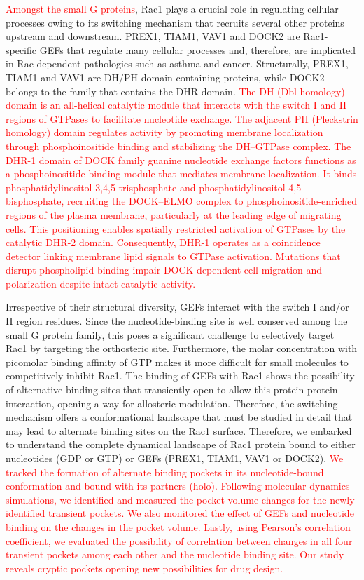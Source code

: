\documentclass[12pt,a4paper]{achemso}
\begin{document}
\textcolor{red}{Amongst the small G proteins}, Rac1 plays a crucial role in regulating cellular processes owing to its switching mechanism that recruits several other proteins upstream and downstream. PREX1, TIAM1, VAV1 and DOCK2 are Rac1-specific GEFs that regulate many cellular processes and, therefore, are implicated in Rac-dependent pathologies such as asthma and cancer.  Structurally, PREX1, TIAM1 and VAV1 are DH/PH domain-containing proteins, while DOCK2 belongs to the family that contains the DHR domain. \textcolor{red}{The DH (Dbl homology) domain is an all-helical catalytic module that interacts with the switch I and II regions of GTPases to facilitate nucleotide exchange. The adjacent PH (Pleckstrin homology) domain regulates activity by promoting membrane localization through phosphoinositide binding and stabilizing the DH–GTPase complex\cite{prex1pdb,tiam1pdb,vav1pdb}.  The DHR-1 domain of DOCK family guanine nucleotide exchange factors\cite{dock2pdb} functions as a phosphoinositide-binding module that mediates membrane localization. It binds phosphatidylinositol-3,4,5-trisphosphate and phosphatidylinositol-4,5-bisphosphate, recruiting the DOCK–ELMO complex to phosphoinositide-enriched regions of the plasma membrane, particularly at the leading edge of migrating cells. This positioning enables spatially restricted activation of GTPases by the catalytic DHR-2 domain. Consequently, DHR-1 operates as a coincidence detector linking membrane lipid signals to GTPase activation. Mutations that disrupt phospholipid binding impair DOCK-dependent cell migration and polarization despite intact catalytic activity.}

Irrespective of their structural diversity, GEFs interact with the switch I and/or II region residues.  Since the nucleotide-binding site is well conserved among the small G protein family, this poses a significant challenge to selectively target Rac1 by targeting the orthosteric site. Furthermore, the molar concentration with picomolar binding affinity of GTP makes it more difficult for small molecules to competitively inhibit Rac1. The binding of GEFs with Rac1 shows the possibility of alternative binding sites that transiently open to allow this protein-protein interaction, opening a way for allosteric modulation. Therefore, the switching mechanism offers a conformational landscape that must be studied in detail that may lead to alternate binding sites on the Rac1 surface. Therefore, we embarked to understand the complete dynamical landscape of Rac1 protein bound to either nucleotides (GDP or GTP) or GEFs (PREX1, TIAM1, VAV1 or DOCK2).  \textcolor{red}{We tracked the formation of alternate binding pockets in its nucleotide-bound conformation and bound with its partners (holo). Following molecular dynamics simulations, we identified and measured the pocket volume changes for the newly identified transient pockets. We also monitored the effect of GEFs and nucleotide binding on the changes in the pocket volume. Lastly, using Pearson's correlation coefficient, we evaluated the possibility of correlation between changes in all four transient pockets among each other and the nucleotide binding site. Our study reveals cryptic pockets opening new possibilities for drug design.}
\end{document}
